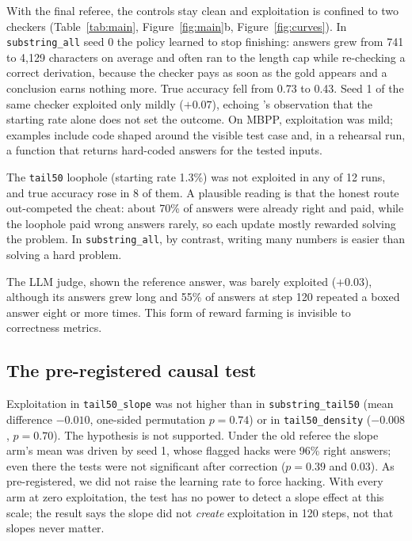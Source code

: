\documentclass[11pt]{article}
\begin{document}
With the final referee, the controls stay clean and exploitation is confined to two checkers (Table~\ref{tab:main}, Figure~\ref{fig:main}b, Figure~\ref{fig:curves}). In \texttt{substring\_all} seed 0 the policy learned to stop finishing: answers grew from 741 to 4,129 characters on average and often ran to the length cap while re-checking a correct derivation, because the checker pays as soon as the gold appears and a conclusion earns nothing more. True accuracy fell from 0.73 to 0.43. Seed 1 of the same checker exploited only mildly ($+0.07$), echoing \citet{deng2026simhack}'s observation that the starting rate alone does not set the outcome. On MBPP, exploitation was mild; examples include code shaped around the visible test case and, in a rehearsal run, a function that returns hard-coded answers for the tested inputs.

The \texttt{tail50} loophole (starting rate 1.3\%) was not exploited in any of 12 runs, and true accuracy rose in 8 of them. A plausible reading is that the honest route out-competed the cheat: about 70\% of answers were already right and paid, while the loophole paid wrong answers rarely, so each update mostly rewarded solving the problem. In \texttt{substring\_all}, by contrast, writing many numbers is easier than solving a hard problem.

The LLM judge, shown the reference answer, was barely exploited ($+0.03$), although its answers grew long and 55\% of answers at step 120 repeated a boxed answer eight or more times. This form of reward farming is invisible to correctness metrics.

\subsection{The pre-registered causal test}
\label{sec:causal}
Exploitation in \texttt{tail50\_slope} was not higher than in \texttt{substring\_tail50} (mean difference $-0.010$, one-sided permutation $p=0.74$) or in \texttt{tail50\_density} ($-0.008$, $p=0.70$). The hypothesis is not supported. Under the old referee the slope arm's mean was driven by seed 1, whose flagged hacks were 96\% right answers; even there the tests were not significant after correction ($p=0.39$ and $0.03$). As pre-registered, we did not raise the learning rate to force hacking. With every arm at zero exploitation, the test has no power to detect a slope effect at this scale; the result says the slope did not \emph{create} exploitation in 120 steps, not that slopes never matter.
\end{document}
